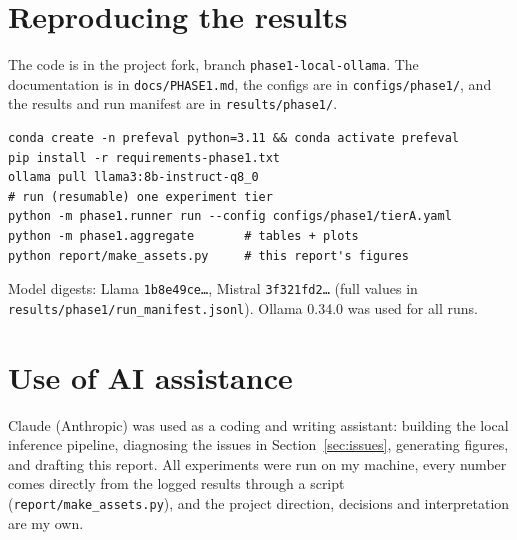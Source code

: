 \documentclass[11pt,a4paper]{article}
\begin{document}
\appendix
\section{Reproducing the results}
The code is in the project fork, branch \nolinkurl{phase1-local-ollama}. The documentation is in \nolinkurl{docs/PHASE1.md}, the
configs are in \nolinkurl{configs/phase1/}, and the results and run manifest are in \nolinkurl{results/phase1/}.
\begin{verbatim}
conda create -n prefeval python=3.11 && conda activate prefeval
pip install -r requirements-phase1.txt
ollama pull llama3:8b-instruct-q8_0
# run (resumable) one experiment tier
python -m phase1.runner run --config configs/phase1/tierA.yaml
python -m phase1.aggregate       # tables + plots
python report/make_assets.py     # this report's figures
\end{verbatim}
Model digests: Llama \texttt{1b8e49ce\dots}, Mistral \texttt{3f321fd2\dots}
(full values in \nolinkurl{results/phase1/run_manifest.jsonl}). Ollama 0.34.0 was used for all runs.

\section{Use of AI assistance}
Claude (Anthropic) was used as a coding and writing assistant: building the local inference pipeline, diagnosing the issues in
Section~\ref{sec:issues}, generating figures, and drafting this report. All experiments were run on my machine, every number
comes directly from the logged results through a script (\texttt{report/make\_assets.py}), and the project direction, decisions
and interpretation are my own.
\end{document}
